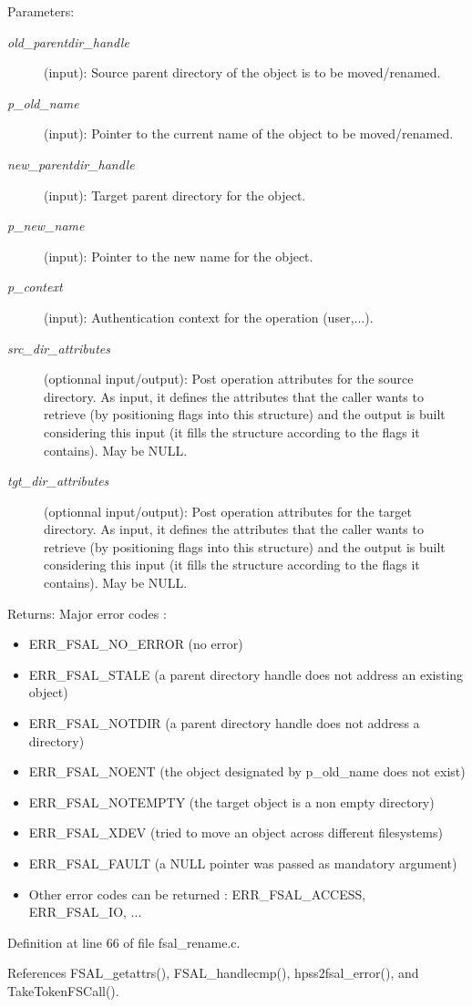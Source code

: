 \begin{Desc}
\item[Parameters:]
\begin{description}
\item[{\em old\_\-parentdir\_\-handle}](input): Source parent directory of the object is to be moved/renamed. \item[{\em p\_\-old\_\-name}](input): Pointer to the current name of the object to be moved/renamed. \item[{\em new\_\-parentdir\_\-handle}](input): Target parent directory for the object. \item[{\em p\_\-new\_\-name}](input): Pointer to the new name for the object. \item[{\em p\_\-context}](input): Authentication context for the operation (user,...). \item[{\em src\_\-dir\_\-attributes}](optionnal input/output): Post operation attributes for the source directory. As input, it defines the attributes that the caller wants to retrieve (by positioning flags into this structure) and the output is built considering this input (it fills the structure according to the flags it contains). May be NULL. \item[{\em tgt\_\-dir\_\-attributes}](optionnal input/output): Post operation attributes for the target directory. As input, it defines the attributes that the caller wants to retrieve (by positioning flags into this structure) and the output is built considering this input (it fills the structure according to the flags it contains). May be NULL.\end{description}
\end{Desc}
\begin{Desc}
\item[Returns:]Major error codes :\begin{itemize}
\item ERR\_\-FSAL\_\-NO\_\-ERROR (no error)\item ERR\_\-FSAL\_\-STALE (a parent directory handle does not address an existing object)\item ERR\_\-FSAL\_\-NOTDIR (a parent directory handle does not address a directory)\item ERR\_\-FSAL\_\-NOENT (the object designated by p\_\-old\_\-name does not exist)\item ERR\_\-FSAL\_\-NOTEMPTY (the target object is a non empty directory)\item ERR\_\-FSAL\_\-XDEV (tried to move an object across different filesystems)\item ERR\_\-FSAL\_\-FAULT (a NULL pointer was passed as mandatory argument)\item Other error codes can be returned : ERR\_\-FSAL\_\-ACCESS, ERR\_\-FSAL\_\-IO, ... \end{itemize}
\end{Desc}


Definition at line 66 of file fsal\_\-rename.c.

References FSAL\_\-getattrs(), FSAL\_\-handlecmp(), hpss2fsal\_\-error(), and Take\-Token\-FSCall().